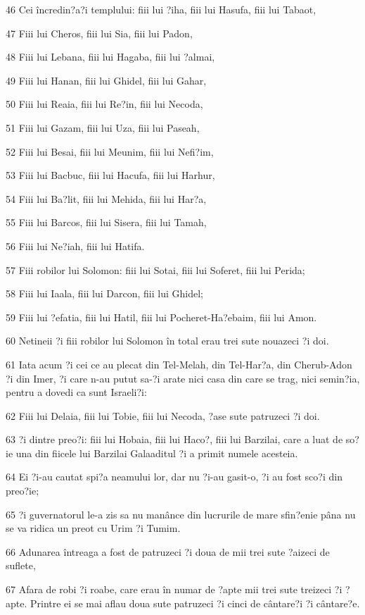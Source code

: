 \par 46 Cei încredin?a?i templului: fiii lui ?iha, fiii lui Hasufa, fiii lui Tabaot,
\par 47 Fiii lui Cheros, fiii lui Sia, fiii lui Padon,
\par 48 Fiii lui Lebana, fiii lui Hagaba, fiii lui ?almai,
\par 49 Fiii lui Hanan, fiii lui Ghidel, fiii lui Gahar,
\par 50 Fiii lui Reaia, fiii lui Re?in, fiii lui Necoda,
\par 51 Fiii lui Gazam, fiii lui Uza, fiii lui Paseah,
\par 52 Fiii lui Besai, fiii lui Meunim, fiii lui Nefi?im,
\par 53 Fiii lui Bacbuc, fiii lui Hacufa, fiii lui Harhur,
\par 54 Fiii lui Ba?lit, fiii lui Mehida, fiii lui Har?a,
\par 55 Fiii lui Barcos, fiii lui Sisera, fiii lui Tamah,
\par 56 Fiii lui Ne?iah, fiii lui Hatifa.
\par 57 Fiii robilor lui Solomon: fiii lui Sotai, fiii lui Soferet, fiii lui Perida;
\par 58 Fiii lui Iaala, fiii lui Darcon, fiii lui Ghidel;
\par 59 Fiii lui ?efatia, fiii lui Hatil, fiii lui Pocheret-Ha?ebaim, fiii lui Amon.
\par 60 Netineii ?i fiii robilor lui Solomon în total erau trei sute nouazeci ?i doi.
\par 61 Iata acum ?i cei ce au plecat din Tel-Melah, din Tel-Har?a, din Cherub-Adon ?i din Imer, ?i care n-au putut sa-?i arate nici casa din care se trag, nici semin?ia, pentru a dovedi ca sunt Israeli?i:
\par 62 Fiii lui Delaia, fiii lui Tobie, fiii lui Necoda, ?ase sute patruzeci ?i doi.
\par 63 ?i dintre preo?i: fiii lui Hobaia, fiii lui Haco?, fiii lui Barzilai, care a luat de so?ie una din fiicele lui Barzilai Galaaditul ?i a primit numele acesteia.
\par 64 Ei ?i-au cautat spi?a neamului lor, dar nu ?i-au gasit-o, ?i au fost sco?i din preo?ie;
\par 65 ?i guvernatorul le-a zis sa nu manânce din lucrurile de mare sfin?enie pâna nu se va ridica un preot cu Urim ?i Tumim.
\par 66 Adunarea întreaga a fost de patruzeci ?i doua de mii trei sute ?aizeci de suflete,
\par 67 Afara de robi ?i roabe, care erau în numar de ?apte mii trei sute treizeci ?i ?apte. Printre ei se mai aflau doua sute patruzeci ?i cinci de cântare?i ?i cântare?e.
